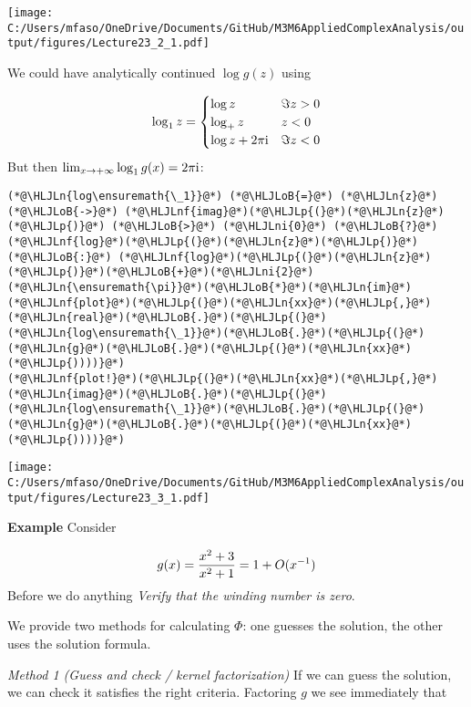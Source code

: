 \documentclass[12pt,a4paper]{article}
\newcommand{\HLJLn}[1]{#1}
\newcommand{\HLJLnf}[1]{\textcolor[RGB]{66,102,213}{#1}}
\newcommand{\HLJLni}[1]{\textcolor[RGB]{59,151,46}{#1}}
\newcommand{\HLJLoB}[1]{\textcolor[RGB]{102,102,102}{\textbf{#1}}}
\newcommand{\HLJLp}[1]{#1}
\def\I{ {\rm i} }
\begin{document}
\texttt{[image: C:/Users/mfaso/OneDrive/Documents/GitHub/M3M6AppliedComplexAnalysis/output/figures/Lecture23\_2\_1.pdf]}

We could have analytically continued $\log g(z)$ using

\[
\log_1 z = \begin{cases} \log z & \Im z > 0 \\
                            \log_+ z & z < 0 \\
                            \log z + 2\pi \I & \Im z < 0
                            \end{cases}
\]
But then $\lim_{x\rightarrow + \infty} \log_1 g(x) = 2 \pi \I$:


\begin{lstlisting}
(*@\HLJLn{log\ensuremath{\_1}}@*) (*@\HLJLoB{=}@*) (*@\HLJLn{z}@*) (*@\HLJLoB{->}@*) (*@\HLJLnf{imag}@*)(*@\HLJLp{(}@*)(*@\HLJLn{z}@*)(*@\HLJLp{)}@*) (*@\HLJLoB{>}@*) (*@\HLJLni{0}@*) (*@\HLJLoB{?}@*) (*@\HLJLnf{log}@*)(*@\HLJLp{(}@*)(*@\HLJLn{z}@*)(*@\HLJLp{)}@*) (*@\HLJLoB{:}@*) (*@\HLJLnf{log}@*)(*@\HLJLp{(}@*)(*@\HLJLn{z}@*)(*@\HLJLp{)}@*)(*@\HLJLoB{+}@*)(*@\HLJLni{2}@*)(*@\HLJLn{\ensuremath{\pi}}@*)(*@\HLJLoB{*}@*)(*@\HLJLn{im}@*)
(*@\HLJLnf{plot}@*)(*@\HLJLp{(}@*)(*@\HLJLn{xx}@*)(*@\HLJLp{,}@*) (*@\HLJLn{real}@*)(*@\HLJLoB{.}@*)(*@\HLJLp{(}@*)(*@\HLJLn{log\ensuremath{\_1}}@*)(*@\HLJLoB{.}@*)(*@\HLJLp{(}@*)(*@\HLJLn{g}@*)(*@\HLJLoB{.}@*)(*@\HLJLp{(}@*)(*@\HLJLn{xx}@*)(*@\HLJLp{))))}@*)
(*@\HLJLnf{plot!}@*)(*@\HLJLp{(}@*)(*@\HLJLn{xx}@*)(*@\HLJLp{,}@*) (*@\HLJLn{imag}@*)(*@\HLJLoB{.}@*)(*@\HLJLp{(}@*)(*@\HLJLn{log\ensuremath{\_1}}@*)(*@\HLJLoB{.}@*)(*@\HLJLp{(}@*)(*@\HLJLn{g}@*)(*@\HLJLoB{.}@*)(*@\HLJLp{(}@*)(*@\HLJLn{xx}@*)(*@\HLJLp{))))}@*)
\end{lstlisting}

\texttt{[image: C:/Users/mfaso/OneDrive/Documents/GitHub/M3M6AppliedComplexAnalysis/output/figures/Lecture23\_3\_1.pdf]}

\textbf{Example} Consider

\[
g(x) = {x^2+3 \over x^2+1} = 1 + O(x^{-1})
\]
Before we do anything \emph{Verify that the winding number is zero}.

We provide two methods for calculating $\Phi$: one guesses the solution, the other uses the solution formula.

\emph{Method 1 (Guess and check / kernel factorization)} If we can guess the solution, we can check it satisfies the right criteria.   Factoring $g$ we see immediately that
\end{document}
